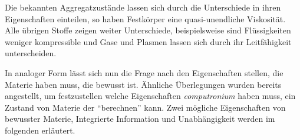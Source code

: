 
Die bekannten Aggregatzustände lassen sich durch die Unterschiede in ihren Eigenschaften einteilen,
so haben Festkörper eine quasi-unendliche Viskosität. Alle übrigen Stoffe zeigen weiter Unterschiede,
beispielsweise sind Flüssigkeiten weniger kompressible und Gase und Plasmen lassen sich durch ihr
Leitfähigkeit unterscheiden. 

In analoger Form lässt sich nun die Frage nach den Eigenschaften stellen, die Materie haben muss, 
die bewusst ist. Ähnliche Überlegungen wurden bereits angestellt, um festzustellen welche Eigenschaften 
\emph{computronium} haben muss, ein Zustand von Materie der \enquote{berechnen} kann.
Zwei mögliche Eigenschaften von bewusster Materie, Integrierte Information und Unabhängigkeit werden im 
folgenden erläutert.
